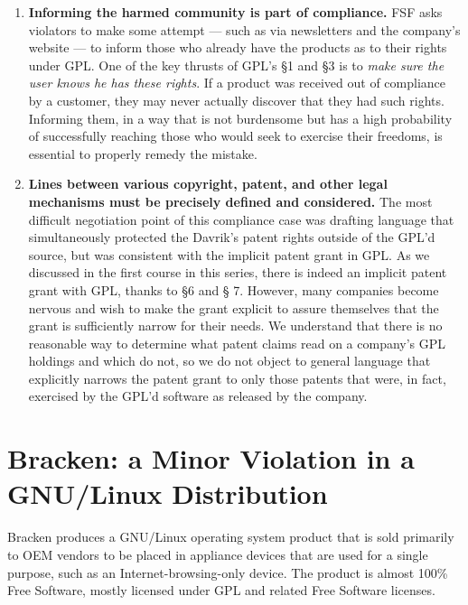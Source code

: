 \documentclass[12pt]{report}
\begin{document}
\begin{enumerate}
\item {\bf Informing the harmed community is part of compliance.} FSF asks
  violators to make some attempt --- such as via newsletters and the
  company's website --- to inform those who already have the products as
  to their rights under GPL\@.  One of the key thrusts of GPL's \S 1 and
  \S 3 is to {\em make sure the user knows he has these rights\/}.  If a
  product was received out of compliance by a customer, they may never
  actually discover that they had such rights.  Informing them, in a way
  that is not burdensome but has a high probability of successfully
  reaching those who would seek to exercise their freedoms, is essential
  to properly remedy the mistake.

\item {\bf Lines between various copyright, patent, and other legal
  mechanisms must be precisely defined and considered.}  The most
  difficult negotiation point of this compliance case was drafting
  language that simultaneously protected the Davrik's patent rights
  outside of the GPL'd source, but was consistent with the implicit patent
  grant in GPL\@.  As we discussed in the first course in this series,
  there is indeed an implicit patent grant with GPL, thanks to \S 6 and \S
  7.  However, many companies become nervous and wish to make the grant
  explicit to assure themselves that the grant is sufficiently narrow for
  their needs.  We understand that there is no reasonable way to determine
  what patent claims read on a company's GPL holdings and which do not, so
  we do not object to general language that explicitly narrows the patent
  grant to only those patents that were, in fact, exercised by the GPL'd
  software as released by the company.

\end{enumerate}

\chapter{Bracken: a Minor Violation in a GNU/Linux Distribution}

Bracken produces a GNU/Linux operating system product that is sold
primarily to OEM vendors to be placed in appliance devices that are used
for a single purpose, such as an Internet-browsing-only device.  The
product is almost 100\% Free Software, mostly licensed under GPL and
related Free Software licenses.
\end{document}
